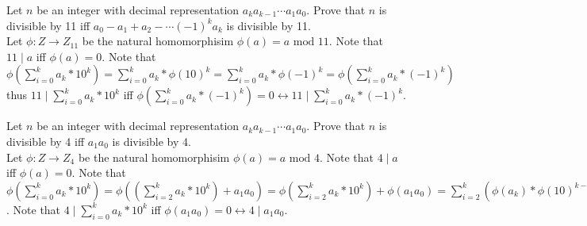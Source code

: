 \documentclass[12pt]{article}
\makeatletter
\theoremstyle{homework}
\newenvironment{exercise}[1]
{\def\@currentlabel{#1}\exercisecore}
{\endexercisecore}
\makeatother
\begin{document}
\begin{exercise}{15.32}
Let $n$ be an integer with decimal representation $a_ka_{k-1}\cdots a_1a_0$.  Prove that $n$ is divisible by 11 iff $a_0-a_1+a_2-\cdots (-1)^ka_k$ is divisible by 11.\\
Let $\phi :Z\rightarrow Z_{11}$ be the natural homomorphisim $\phi(a)=a\text{ mod }11$.  Note that $11\mid a$ iff $\phi(a)=0$.  Note that $\phi(\sum_{i=0}^{k} a_k*10^k)=\sum_{i=0}^{k} a_k*\phi(10)^k=\sum_{i=0}^{k} a_k*\phi(-1)^k=\phi(\sum_{i=0}^{k} a_k*(-1)^k)$ thus $11\mid \sum_{i=0}^{k} a_k*10^k$ iff $\phi(\sum_{i=0}^{k} a_k*(-1)^k)=0\longleftrightarrow 11\mid \sum_{i=0}^{k} a_k*(-1)^k$.
\end{exercise}

\begin{exercise}{15.36}
Let $n$ be an integer with decimal representation $a_ka_{k-1}\cdots a_1a_0$.  Prove that $n$ is divisible by 4 iff $a_1a_0$ is divisible by 4.\\
Let $\phi :Z\rightarrow Z_{4}$ be the natural homomorphisim $\phi(a)=a\text{ mod }4$.  Note that $4\mid a$ iff $\phi(a)=0$.  Note that $\phi(\sum_{i=0}^{k} a_k*10^k)=\phi((\sum_{i=2}^{k} a_k*10^k)+a_1a_0)=\phi(\sum_{i=2}^{k} a_k*10^k)+\phi(a_1a_0)=\sum_{i=2}^{k} (\phi(a_k)*\phi(10)^{k-2}*\phi(100))+\phi(a_1a_0)=\sum_{i=2}^{k} (\phi(a_k)*\phi(10)^{k-2}*0)+\phi(a_1a_0)=\phi(a_1a_0)$.  Note that $4\mid \sum_{i=0}^{k} a_k*10^k$ iff $\phi(a_1a_0)=0\longleftrightarrow 4\mid a_1a_0$.
\end{exercise}
\end{document}
